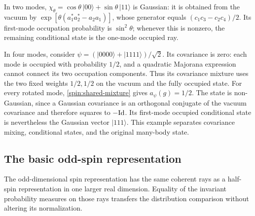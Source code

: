 \begin{example}
\label{spin:example}
In two modes,
$\chi_\theta=\cos\theta\,|00\rangle+\sin\theta\,|11\rangle$
is Gaussian: it is obtained from the vacuum by
$\exp[\theta(a_1^*a_2^*-a_2a_1)]$, whose generator equals
$(c_1c_3-c_2c_4)/2$.
Its first-mode occupation probability is $\sin^2\theta$;
whenever this is nonzero, the remaining conditional state is the
one-mode occupied ray.

In four modes, consider
$\psi=(|0000\rangle+|1111\rangle)/\sqrt2$.
Its covariance is zero: each mode is occupied with probability
$1/2$, and a quadratic Majorana expression cannot connect its two
occupation components.  Thus its covariance mixture uses the two
fixed weights $1/2,1/2$ on the vacuum and the fully occupied state.
For every rotated mode, \eqref{spin:shared-mixture} gives
$a_\psi(g)=1/2$.  The state is non-Gaussian, since a Gaussian
covariance is an orthogonal conjugate of the vacuum covariance
and therefore squares to $-\mathrm{Id}$.  Its first-mode occupied
conditional state is nevertheless the Gaussian vector $|111\rangle$.
This example separates covariance mixing, conditional states, and
the original many-body state.
\end{example}

\subsection{The basic odd-spin representation}

The odd-dimensional spin representation has the same coherent rays
as a half-spin representation in one larger real dimension.  Equality
of the invariant probability measures on those rays transfers the
distribution comparison without altering its normalization.

